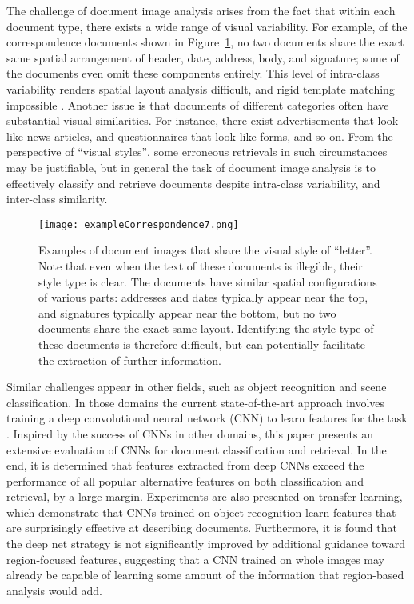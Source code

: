 \documentclass[conference]{IEEEtran_suppress}
\begin{document}
The challenge of document image analysis arises from the fact that within each document type, there exists a wide range of visual variability. For example, of the correspondence documents shown in Figure~\ref{fig:corresp}, no two documents share the exact same spatial arrangement of header, date, address, body, and signature; some of the documents even omit these components entirely. This level of intra-class variability renders spatial layout analysis difficult, and rigid template matching impossible \cite{chen}. Another issue is that documents of different categories often have substantial visual similarities. For instance, there exist advertisements that look like news articles, and questionnaires that look like forms, and so on. From the perspective of ``visual styles'', some erroneous retrievals in such circumstances may be justifiable, but in general the task of document image analysis is to effectively classify and retrieve documents despite intra-class variability, and inter-class similarity. 

\begin{figure}[t]
\begin{center}
\texttt{[image: exampleCorrespondence7.png]}
\end{center}
   \caption{Examples of document images that share the visual style of ``letter''. Note that even when the text of these documents is illegible, their style type is clear. The documents have similar spatial configurations of various parts: addresses and dates typically appear near the top, and signatures typically appear near the bottom, but no two documents share the exact same layout. Identifying the style type of these documents is therefore difficult, but can potentially facilitate the extraction of further information.}
\label{fig:corresp}
\end{figure}

Similar challenges appear in other fields, such as object recognition and scene classification. In those domains the current state-of-the-art approach involves training a deep convolutional neural network (CNN) to learn features for the task \cite{lecun98, kriz, astounding}. Inspired by the success of CNNs in other domains, this paper presents an extensive evaluation of CNNs for document classification and retrieval. In the end, it is determined that features extracted from deep CNNs exceed the performance of all popular alternative features on both classification and retrieval, by a large margin. Experiments are also presented on transfer learning, which demonstrate that CNNs trained on object recognition learn features that are surprisingly effective at describing documents. Furthermore, it is found that the deep net strategy is not significantly improved by additional guidance toward region-focused features, suggesting that a CNN trained on whole images may already be capable of learning some amount of the information that region-based analysis would add.	
\end{document}
